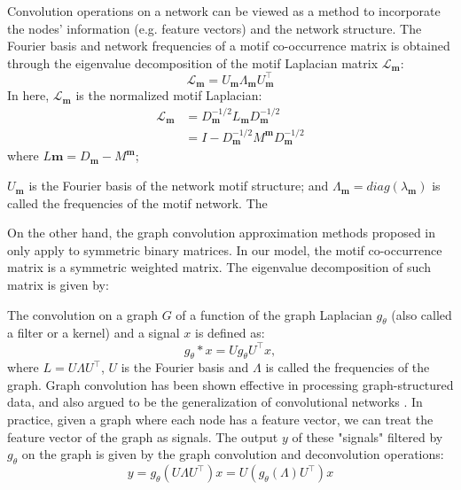 \documentclass{article}
\theoremstyle{definition}
\begin{document}
Convolution operations on a network can be viewed as a method to
incorporate the nodes' information (e.g. feature vectors) 
and the network structure. The Fourier basis and network frequencies of
a motif co-occurrence matrix is obtained through the eigenvalue
decomposition of the motif Laplacian matrix $\mathcal{L}_{\mathbf{m}}$:
\begin{equation} \label{eq:eigm}
\mathcal{L}_{\mathbf{m}} = U_{\mathbf{m}} \Lambda_{\mathbf{m}} U^{\top}_{\mathbf{m}}
\end{equation}
In here, $\mathcal{L}_{\mathbf{m}}$ is the normalized motif Laplacian:
\begin{equation} \label{eq:eigm}
\begin{aligned}
\mathcal{L}_{\mathbf{m}} &= D_{\mathbf{m}}^{-1/2} L_{\mathbf{m}} D_{\mathbf{m}}^{-1/2} \\
&= I - D_{\mathbf{m}}^{-1/2} M^{\mathbf{m}} D_{\mathbf{m}}^{-1/2}
\end{aligned}
\end{equation}
where $L{\mathbf{m}} = D_{\mathbf{m}} - M^{\mathbf{m}}$; 



$U_{\mathbf{m}}$ is the Fourier basis of the network motif structure;
and $\Lambda_{\mathbf{m}} = diag(\lambda_{\mathbf{m}})$ is called the 
frequencies of the motif network. The 


On the other hand, the graph convolution approximation methods 
proposed in \cite{gcn,defferrard2016convolutional} only apply to symmetric 
binary matrices. In our model, the motif co-occurrence matrix is a 
symmetric weighted matrix. The eigenvalue decomposition of such matrix is 
given by:




The convolution on a graph $G$ of a function of the graph 
Laplacian $g_{\theta}$ (also called a filter or a kernel) 
and a signal $x$ is defined as:
$$g_{\theta} \ast x = U g_{\theta} U^{\top} x,$$
where $L = U \Lambda U^\top$, $U$ is the Fourier basis
and $\Lambda$ is called the frequencies of the graph. 
Graph convolution has been shown effective in processing
graph-structured data, and also argued to be the generalization
of convolutional networks
\cite{shuman2013emerging,defferrard2016convolutional,gcn}.
In practice, given a graph where each node has a feature vector,
we can treat the feature vector of the graph as signals. The output $y$
of these "signals" filtered by $g_\theta$ on the graph is given by
the graph convolution and deconvolution operations: 
\begin{equation}
\label{eq:1}
y = g_\theta (U \Lambda U^\top) x = U (g_\theta(\Lambda) U^\top)x
\end{equation}
\end{document}
